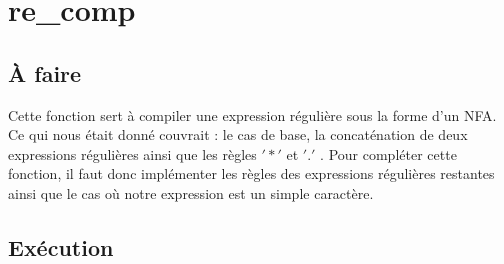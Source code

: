 \documentclass{article}
\begin{document}
\section{re\_comp}
\subsection{À faire}

   Cette fonction sert à compiler une expression régulière sous la forme d'un
   NFA. Ce qui nous était donné couvrait : le cas de base, la concaténation de 
   deux expressions régulières ainsi que les règles $'*'$ et $'.'$ . Pour 
   compléter cette fonction, il faut donc implémenter les règles des expressions 
   régulières restantes ainsi que le cas où notre expression est un simple caractère.
    
 \subsection{Exécution}
 
\end{document}
